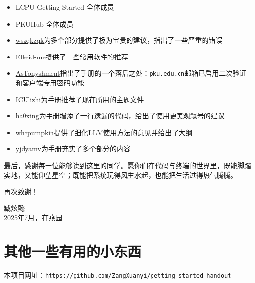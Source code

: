\documentclass[../main.tex]{subfiles}
\begin{document}
\begin{itemize}
  \item LCPU Getting Started 全体成员
  \item PKUHub 全体成员
  \item \faGithub\href{https://github.com/wszqkzqk}{wszqkzqk}为多个部分提供了极为宝贵的建议，指出了一些严重的错误
  \item \faGithub\href{https://github.com/Elkeid-me}{Elkeid-me}提供了一些常用软件的推荐
  \item \faGithub\href{https://github.com/AsTonyshment}{AsTonyshment}指出了手册的一个落后之处：\texttt{pku.edu.cn}邮箱已启用二次验证和客户端专用密码功能
  \item \faGithub\href{https://github.com/ICUlizhi}{ICUlizhi}为手册推荐了现在所用的主题文件
  \item \faGithub\href{https://github.com/ha0xing}{ha0xing}为手册增添了一行遗漏的代码，给出了使用更美观飘号的建议
  \item \faGithub\href{https://github.com/whcpumpkin}{whcpumpkin}提供了细化LLM使用方法的意见并给出了大纲
  \item \faGithub\href{https://github.com/yjdyamv}{yjdyamv}为手册充实了多个部分的内容
\end{itemize}

最后，感谢每一位能够读到这里的同学。愿你们在代码与终端的世界里，既能脚踏实地，又能仰望星空；既能把系统玩得风生水起，也能把生活过得热气腾腾。

再次致谢！

\vspace{2em}
\begin{flushright}
  臧炫懿 \\
  2025年7月，在燕园
\end{flushright}

\chapter{其他一些有用的小东西}

本项目网址：\texttt{https://github.com/ZangXuanyi/getting-started-handout}
\end{document}
